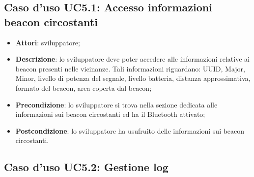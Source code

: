 \documentclass[../AnalisiDeiRequisiti.tex]{subfiles}
\begin{document}
\subsection{Caso d'uso UC5.1: Accesso informazioni beacon circostanti}
\begin{itemize}
\item \textbf{Attori}: sviluppatore;
\item \textbf{Descrizione}: lo sviluppatore deve poter accedere alle informazioni relative ai beacon presenti nelle vicinanze. Tali informazioni riguardano: UUID, Major, Minor, livello di potenza del segnale, livello batteria, distanza approssimativa, formato del beacon, area coperta dal beacon; 
      \item \textbf{Precondizione}: lo sviluppatore si trova nella sezione dedicata alle informazioni sui beacon circostanti ed ha il Bluetooth attivato;
    \item \textbf{Postcondizione}: lo sviluppatore ha usufruito delle informazioni sui beacon circostanti.
  \end{itemize}
\hypertarget{UC5.2}{}
\subsection{Caso d'uso UC5.2: Gestione log}
\end{document}
